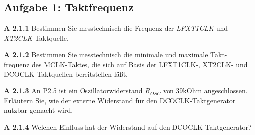 \subsection*{Aufgabe 1: Taktfrequenz}

\begin{description}

\item{\bfseries A 2.1.1} Bestimmen Sie messtechnisch die Frequenz der \emph{LFXT1CLK} und  \emph{XT2CLK} Taktquelle.

\item{\bfseries A 2.1.2} Bestimmen Sie messtechnisch die minimale und maximale Takt- frequenz des MCLK-Taktes, die sich auf Basis der LFXT1CLK-, XT2CLK- und DCOCLK-Taktquellen bereitstellen läßt.

\item{\bfseries A 2.1.3} An P2.5 ist ein Oszillatorwiderstand $R_{OSC}$ von 39kOhm angeschlossen. Erläutern Sie, wie der externe Widerstand für den DCOCLK-Taktgenerator nutzbar gemacht wird. 

\item{\bfseries A 2.1.4} Welchen Einfluss hat der Widerstand auf den DCOCLK-Taktgenerator? 

\end{description}